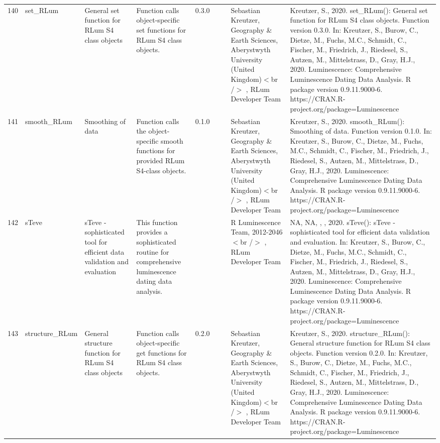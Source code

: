 \begin{table}[ht]
\begin{tabular}{rllllllll}
 \\ 
  140 & set\_RLum & General set function for RLum S4 class objects & Function calls object-specific set functions for RLum S4 class objects. & 0.3.0
 &  &  & Sebastian Kreutzer, Geography \& Earth Sciences, Aberystwyth University (United Kingdom)$<$br /$>$ , RLum Developer Team & Kreutzer, S., 2020. set\_RLum(): General set function for RLum S4 class objects. Function version 0.3.0. In: Kreutzer, S., Burow, C., Dietze, M., Fuchs, M.C., Schmidt, C., Fischer, M., Friedrich, J., Riedesel, S., Autzen, M., Mittelstrass, D., Gray, H.J., 2020. Luminescence: Comprehensive Luminescence Dating Data Analysis. R package version 0.9.11.9000-6. https://CRAN.R-project.org/package=Luminescence
 \\ 
  141 & smooth\_RLum & Smoothing of data & Function calls the object-specific smooth functions for provided RLum S4-class objects. & 0.1.0
 &  &  & Sebastian Kreutzer, Geography \& Earth Sciences, Aberystwyth University (United Kingdom)$<$br /$>$ , RLum Developer Team & Kreutzer, S., 2020. smooth\_RLum(): Smoothing of data. Function version 0.1.0. In: Kreutzer, S., Burow, C., Dietze, M., Fuchs, M.C., Schmidt, C., Fischer, M., Friedrich, J., Riedesel, S., Autzen, M., Mittelstrass, D., Gray, H.J., 2020. Luminescence: Comprehensive Luminescence Dating Data Analysis. R package version 0.9.11.9000-6. https://CRAN.R-project.org/package=Luminescence
 \\ 
  142 & sTeve & sTeve - sophisticated tool for efficient data validation and evaluation & This function provides a sophisticated routine for comprehensive luminescence dating data analysis. &  &  &  & R Luminescence Team, 2012-2046$<$br /$>$ , RLum Developer Team & NA, NA, , , 2020. sTeve(): sTeve - sophisticated tool for efficient data validation and evaluation. In: Kreutzer, S., Burow, C., Dietze, M., Fuchs, M.C., Schmidt, C., Fischer, M., Friedrich, J., Riedesel, S., Autzen, M., Mittelstrass, D., Gray, H.J., 2020. Luminescence: Comprehensive Luminescence Dating Data Analysis. R package version 0.9.11.9000-6. https://CRAN.R-project.org/package=Luminescence
 \\ 
  143 & structure\_RLum & General structure function for RLum S4 class objects & Function calls object-specific get functions for RLum S4 class objects. & 0.2.0
 &  &  & Sebastian Kreutzer, Geography \& Earth Sciences, Aberystwyth University (United Kingdom)$<$br /$>$ , RLum Developer Team & Kreutzer, S., 2020. structure\_RLum(): General structure function for RLum S4 class objects. Function version 0.2.0. In: Kreutzer, S., Burow, C., Dietze, M., Fuchs, M.C., Schmidt, C., Fischer, M., Friedrich, J., Riedesel, S., Autzen, M., Mittelstrass, D., Gray, H.J., 2020. Luminescence: Comprehensive Luminescence Dating Data Analysis. R package version 0.9.11.9000-6. https://CRAN.R-project.org/package=Luminescence

\end{tabular}
\end{table}
